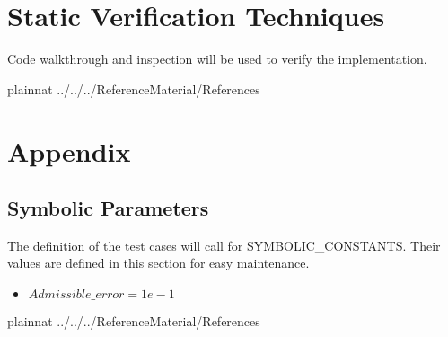 \documentclass[12pt, titlepage]{article}
\begin{document}
\section{Static Verification Techniques}

Code walkthrough and inspection will be used to verify the implementation.
				
 {plainnat}
 {../../../ReferenceMaterial/References}

\newpage

\section{Appendix}



\subsection{Symbolic Parameters}

The definition of the test cases will call for SYMBOLIC\_CONSTANTS.
Their values are defined in this section for easy maintenance.
\begin{itemize}
	\item $Admissible\_error = 1e-1$
\end{itemize}





 {plainnat}
 {../../../ReferenceMaterial/References}
\end{document}
